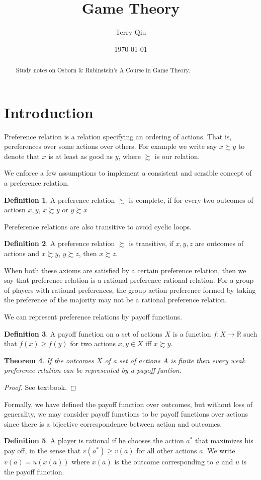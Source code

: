 \documentclass{tufte-handout}
\title{Game Theory}
\author[Terry Qiu]{Terry Qiu}
\date{\today}  %
\newtheorem{thm}{Theorem}
\theoremstyle{definition}
\newtheorem{defn}[thm]{Definition}
\theoremstyle{remark}
\begin{document}
\maketitle
\begin{abstract}
Study notes on Osborn \& Rubinstein's A Course in Game Theory.
\end{abstract}
\tableofcontents
\section{Introduction}
Preference relation is a relation specifying an ordering of actions. That is, pereferences over some actions over others. For example we write say $x \succsim y$ to denote that $x$ is at least as good as $y$, where $\succsim$ is our relation.
\vspace{1mm}

We enforce a few assumptions to implement a consistent and sensible concept of a preference relation.
\begin{defn}
    A preference relation $\succsim$ is complete, if for every two outcomes of actiosn $x,y$, $x\succsim y$ or $y\succsim x$
\end{defn}
Pereference relations are also transitive to avoid cyclic loops.
\begin{defn}
    A preference relation $\succsim$ is transitive, if $x,y,z$ are outcomes of actions and $x\succsim y$, $y\succsim z$, then $x \succsim z$.
\end{defn}
When both these axioms are satisfied by a certain preference relation, then we say that preference relation is a rational preference rational relation.
For a group of players with rational preferences, the group action preference formed by taking the preference of the majority may not be a rational preference relation. 
\vspace{1mm}

We can represent preference relations by payoff functions.
\begin{defn}
    A payoff function on a set of actions $X$ is a function $f:X\rightarrow \mathbb{R}$ such that $f(x)\geq f(y)$ for two actions $x,y\in X$ iff $x\succsim y$.
\end{defn}
\begin{thm}
    If the outcomes $X$ of a set of actions $A$ is finite then every weak preference relation can be represented by a payoff funtion.
\end{thm}
\begin{proof}
    See textbook.
\end{proof}
Formally, we have defined the payoff function over outcomes, but without loss of generality, we may consider payoff functions to be payoff functions over actions since there is a bijective correspondence between action and outcomes.
\begin{defn}
    A player is rational if he chooses the action $a^*$ that maximizes his pay off, in the sense that $v(a^*)\geq v(a)$ for all other actions $a$. We write $v(a)= u(x(a))$ where $x(a)$ is the outcome corresponding to $a$ and $u$ is the payoff function.
\end{defn}
\newpage
\end{document}
